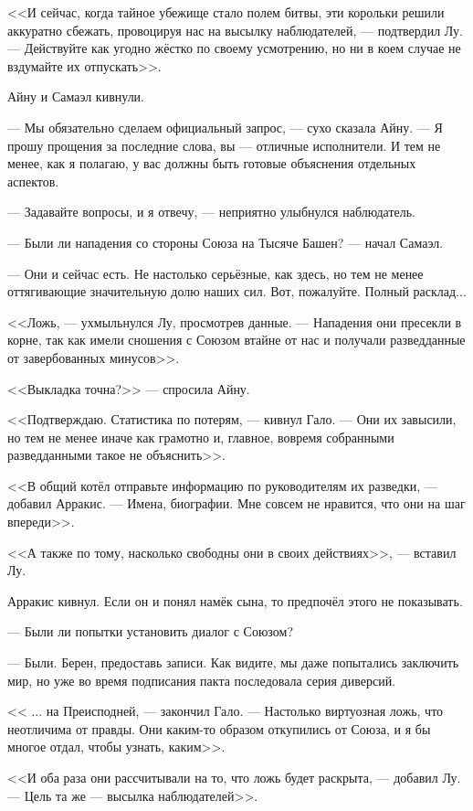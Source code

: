 <<И сейчас, когда тайное убежище стало полем битвы, эти корольки решили аккуратно сбежать, провоцируя нас на высылку наблюдателей, --- подтвердил Лу.
--- Действуйте как угодно жёстко по своему усмотрению, но ни в коем случае не вздумайте их отпускать>>.

Айну и Самаэл кивнули.

--- Мы обязательно сделаем официальный запрос, --- сухо сказала Айну.
--- Я прошу прощения за последние слова, вы --- отличные исполнители.
И тем не менее, как я полагаю, у вас должны быть готовые объяснения отдельных аспектов.

--- Задавайте вопросы, и я отвечу, --- неприятно улыбнулся наблюдатель.

--- Были ли нападения со стороны Союза на Тысяче Башен? --- начал Самаэл.

--- Они и сейчас есть.
Не настолько серьёзные, как здесь, но тем не менее оттягивающие значительную долю наших сил.
Вот, пожалуйте.
Полный расклад...

<<Ложь, --- ухмыльнулся Лу, просмотрев данные.
--- Нападения они пресекли в корне, так как имели сношения с Союзом втайне от нас и получали разведданные от завербованных минусов>>.

<<Выкладка точна?>> --- спросила Айну.

<<Подтверждаю.
Статистика по потерям, --- кивнул Гало.
--- Они их завысили, но тем не менее иначе как грамотно и, главное, вовремя собранными разведданными такое не объяснить>>.

<<В общий котёл отправьте информацию по руководителям их разведки, --- добавил Арракис.
--- Имена, биографии.
Мне совсем не нравится, что они на шаг впереди>>.

<<А также по тому, насколько свободны они в своих действиях>>, --- вставил Лу.

Арракис кивнул.
Если он и понял намёк сына, то предпочёл этого не показывать.

--- Были ли попытки установить диалог с Союзом?

--- Были.
Берен, предоставь записи.
Как видите, мы даже попытались заключить мир, но уже во время подписания пакта последовала серия диверсий.

<< ... на Преисподней, --- закончил Гало.
--- Настолько виртуозная ложь, что неотличима от правды.
Они каким-то образом откупились от Союза, и я бы многое отдал, чтобы узнать, каким>>.

<<И оба раза они рассчитывали на то, что ложь будет раскрыта, --- добавил Лу.
--- Цель та же --- высылка наблюдателей>>.

